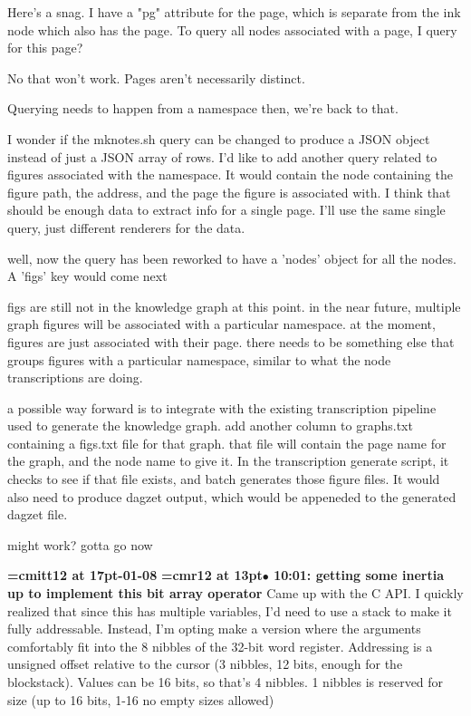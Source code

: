 Here's a snag. I have a "pg" attribute for the page, which is separate from the ink node which also has the page. To query all nodes associated with a page, I query for this page?
\par

No that won't work. Pages aren't necessarily distinct.
\par

Querying needs to happen from a namespace then, we're back to that.
\par

I wonder if the mknotes.sh query can be changed to produce a JSON object instead of just a JSON array of rows. I'd like to add another query related to figures associated with the namespace. It would contain the node containing the figure path, the address, and the page the figure is associated with. I think that should be enough data to extract info for a single page. I'll use the same single query, just different renderers for the data.
\par

well, now the query has been reworked to have a 'nodes' object for all the nodes. A 'figs' key would come next
\par

figs are still not in the knowledge graph at this point. in the near future, multiple graph figures will be associated with a particular namespace. at the moment, figures are just associated with their page. there needs to be something else that groups figures with a particular namespace, similar to what the node transcriptions are doing.
\par

a possible way forward is to integrate with the existing transcription pipeline used to generate the knowledge graph. add another column to graphs.txt containing a figs.txt file for that graph. that file will contain the page name for the graph, and the node name to give it. In the transcription generate script, it checks to see if that file exists, and batch generates those figure files. It would also need to produce dagzet output, which would be appeneded to the generated dagzet file.
\par

might work? gotta go now
\par

{\medskip\noindent\bf\font\titlefont=cmitt12 at 17pt-01-08}\medskip
{\smallskip\noindent\bf\font\titlefont=cmr12 at 13pt\titlefont $\bullet$ 10:01: getting some inertia up to implement this bit array operator}\smallskip
Came up with the C API. I quickly realized that since this has multiple variables, I'd need to use a stack to make it fully addressable. Instead, I'm opting make a version where the arguments comfortably fit into the 8 nibbles of the 32-bit word register. Addressing is a unsigned offset relative to the cursor (3 nibbles, 12 bits, enough for the blockstack). Values can be 16 bits, so that's 4 nibbles. 1 nibbles is reserved for size (up to 16 bits, 1-16 no empty sizes allowed)
\par


